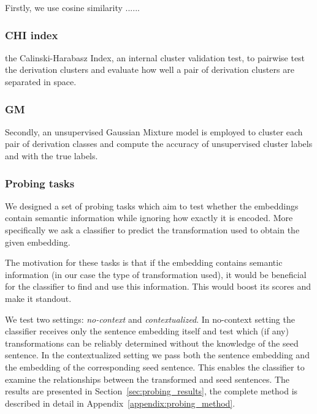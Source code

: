 \documentclass[11pt]{article}
\begin{document}
Firstly, we use cosine similarity ......

\subsubsection{CHI index}

the Calinski-Harabasz Index, an internal cluster validation test, to pairwise
test the derivation clusters and evaluate how well a pair of derivation
clusters are separated in space.

\subsubsection{GM}

Secondly, an unsupervised Gaussian Mixture model is employed to cluster each
pair of derivation classes and compute the accuracy of unsupervised cluster
labels and with the true labels.



\subsubsection{Probing tasks}

We designed a set of probing tasks which aim to test whether the embeddings
contain semantic information while ignoring how exactly it is encoded. More
specifically we ask a classifier to predict the transformation used to obtain
the given embedding.

The motivation for these tasks is that if the embedding contains semantic
information (in our case the type of transformation used), it would be
beneficial for the classifier to find and use this information. This would
boost its scores and make it standout.

We test two settings: \emph{no-context} and \emph{contextualized}. In
no-context setting the classifier receives only the sentence embedding itself
and test which (if any) transformations can be reliably determined without the
knowledge of the seed sentence. In the contextualized setting we pass both the
sentence embedding and the embedding of the corresponding seed sentence. This
enables the classifier to examine the relationships between the transformed and
seed sentences. The results are presented in Section~\ref{sec:probing_results},
the complete method is described in detail in
Appendix~\ref{appendix:probing_method}.
\end{document}

